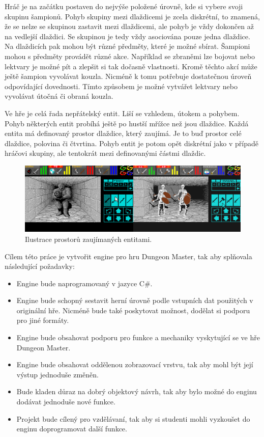 Hráč je na začátku postaven do nejvýše položené úrovně, kde si vybere svoji skupinu šampionů. 
Pohyb skupiny mezi dlaždicemi je zcela diskrétní, to znamená, že se nelze se skupinou zastavit mezi dlaždicemi, ale pohyb je vždy dokončen
až na vedlejší dlaždici. Se skupinou je tedy vždy asociována pouze jedna dlaždice. Na dlaždicích pak mohou
být různé předměty, které je možné sbírat. Šampioni mohou s předměty provádět různé akce.
Například se zbraněmi lze bojovat nebo lektvary je možné pít a zlepšit si tak dočasně vlastnosti. Kromě těchto 
akcí může ještě šampion vyvolávat kouzla. Nicméně k tomu potřebuje dostatečnou úroveň odpovídající dovednosti.
Tímto způsobem je možné vytvářet lektvary nebo vyvolávat útočná či obraná kouzla.

Ve hře je celá řada nepřátelský entit. Liší se vzhledem, útokem a pohybem. Pohyb některých entit 
probíhá ještě po hustší mřížce než jsou dlaždice. Každá entita má definovaný prostor dlaždice, který zaujímá. Je to buď prostor
celé dlaždice, polovina či čtvrtina.  Pohyb entit je potom opět diskrétní jako v případě hráčovi skupiny, 
ale tentokrát mezi definovanými částmi dlaždic. 

\begin{figure}[h]\centering
\includegraphics[width=\textwidth]{./img/DM-group-example.png}
\caption{Ilustrace prostorů zaujímaných entitami.}
\label{obr2:uvod}
\end{figure}

Cílem této práce je vytvořit engine pro hru Dungeon Master, tak aby splňovala následující požadavky:
\begin{itemize}
\item Engine bude naprogramovaný v jazyce C\#.
\item Engine bude schopný sestavit herní úrovně podle vstupních dat použitých v originální hře. Nicméně
	bude také poskytovat možnost, dodělat si podporu pro jiné formáty.
\item Engine bude obsahovat podporu pro funkce a mechaniky vyskytující se ve hře Dungeon Master.
\item Engine bude obsahovat oddělenou zobrazovací vrstvu, tak aby mohl být její výstup jednoduše změněn.
\item Bude kladen důraz na dobrý objektový návrh, tak aby bylo možné do enginu dodávat jednoduše nové funkce.
\item Projekt bude cílený pro vzdělávaní, tak aby si studenti mohli vyzkoušet do enginu doprogramovat další funkce.
\end{itemize}

